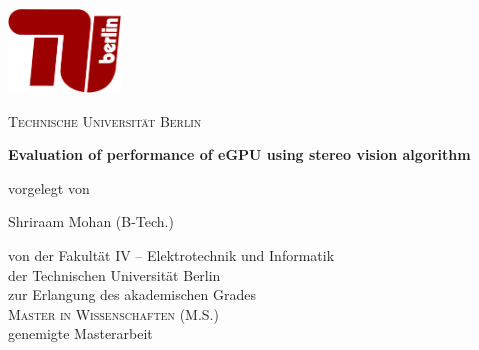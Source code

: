 
\begin{titlepage}
  \begin{center}
	  


	\centering
	\includegraphics[width=3cm]{figures/tub.pdf}\\
	\vspace{0.8em}
	\LARGE 

	\textsc{Technische Universit\"at Berlin}

    \vspace{1cm}

    \sffamily \LARGE \textbf{Evaluation of performance of eGPU using stereo vision algorithm}

    \vspace{1.5cm}





    \normalsize vorgelegt von

    \vspace{.1cm}

    \large Shriraam Mohan (B-Tech.)

    \vspace{.8cm}



    \normalsize von der Fakult\"{a}t IV -- Elektrotechnik und Informatik\\
    \normalsize der Technischen Universit\"{a}t Berlin\\
    \normalsize zur Erlangung des akademischen Grades\\
    \large \textsc{Master in Wissenschaften (M.S.)}\\
    \normalsize genemigte Masterarbeit\\

    \vspace{1cm}


\end{center}
\end{titlepage}
